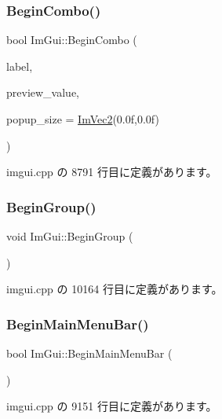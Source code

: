 \subsubsection{\texorpdfstring{Begin\+Combo()}{BeginCombo()}}
{\footnotesize\ttfamily bool Im\+Gui\+::\+Begin\+Combo (\begin{DoxyParamCaption}\item[{const char $\ast$}]{label,  }\item[{const char $\ast$}]{preview\+\_\+value,  }\item[{\mbox{\hyperlink{struct_im_vec2}{Im\+Vec2}}}]{popup\+\_\+size = {\ttfamily \mbox{\hyperlink{struct_im_vec2}{Im\+Vec2}}(0.0f,0.0f)} }\end{DoxyParamCaption})}



 imgui.\+cpp の 8791 行目に定義があります。

\mbox{\label{namespace_im_gui_a42407e196b7ed2a8755bff28aae9805f}} 
\subsubsection{\texorpdfstring{Begin\+Group()}{BeginGroup()}}
{\footnotesize\ttfamily void Im\+Gui\+::\+Begin\+Group (\begin{DoxyParamCaption}{ }\end{DoxyParamCaption})}



 imgui.\+cpp の 10164 行目に定義があります。

\mbox{\label{namespace_im_gui_a55cb9cfb9865204ac6fb21c965784f78}} 
\subsubsection{\texorpdfstring{Begin\+Main\+Menu\+Bar()}{BeginMainMenuBar()}}
{\footnotesize\ttfamily bool Im\+Gui\+::\+Begin\+Main\+Menu\+Bar (\begin{DoxyParamCaption}{ }\end{DoxyParamCaption})}



 imgui.\+cpp の 9151 行目に定義があります。

